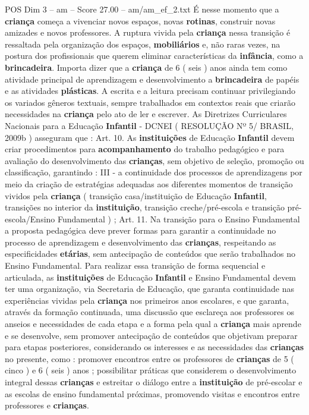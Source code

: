 \begin{textsample}{POS Dim 3 – am – Score 27.00 – am/am\_ef\_2.txt}
É nesse momento que a \textbf{criança} começa a vivenciar novos espaços, novas \textbf{rotinas}, construir novas amizades e novos professores.
A ruptura vivida pela \textbf{criança} nessa transição é ressaltada pela organização dos espaços, \textbf{mobiliários} e, não raras vezes, na postura dos profissionais que querem eliminar características da \textbf{infância}, como a \textbf{brincadeira}.
Importa dizer que a \textbf{criança} de 6 ( seis ) anos ainda tem como atividade principal de aprendizagem e desenvolvimento a \textbf{brincadeira} de papéis e as atividades \textbf{plásticas}.
A escrita e a leitura precisam continuar privilegiando os variados gêneros textuais, sempre trabalhados em contextos reais que criarão necessidades na \textbf{criança} pelo ato de ler e escrever.
As Diretrizes Curriculares Nacionais para a Educação \textbf{Infantil} - DCNEI ( RESOLUÇÃO Nº 5/ BRASIL, 2009b ) asseguram que : Art. 10.
As \textbf{instituições} de Educação \textbf{Infantil} devem criar procedimentos para \textbf{acompanhamento} do trabalho pedagógico e para avaliação do desenvolvimento das \textbf{crianças}, sem objetivo de seleção, promoção ou classificação, garantindo : III - a continuidade dos processos de aprendizagens por meio da criação de estratégias adequadas aos diferentes momentos de transição vividos pela \textbf{criança} ( transição casa/instituição de Educação \textbf{Infantil}, transições no interior da \textbf{instituição}, transição creche/pré-escola e transição pré-escola/Ensino Fundamental ) ; Art. 11.
Na transição para o Ensino Fundamental a proposta pedagógica deve prever formas para garantir a continuidade no processo de aprendizagem e desenvolvimento das \textbf{crianças}, respeitando as especificidades \textbf{etárias}, sem antecipação de conteúdos que serão trabalhados no Ensino Fundamental.
Para realizar essa transição de forma sequencial e articulada, as \textbf{instituições} de Educação \textbf{Infantil} e Ensino Fundamental devem ter uma organização, via Secretaria de Educação, que garanta continuidade nas experiências vividas pela \textbf{criança} nos primeiros anos escolares, e que garanta, através da formação continuada, uma discussão que esclareça aos professores os anseios e necessidades de cada etapa e a forma pela qual a \textbf{criança} mais aprende e se desenvolve, sem promover antecipação de conteúdos que objetivam preparar para etapas posteriores, considerando os interesses e as necessidades das \textbf{crianças} no presente, como : promover encontros entre os professores de \textbf{crianças} de 5 ( cinco ) e 6 ( seis ) anos ; possibilitar práticas que considerem o desenvolvimento integral dessas \textbf{crianças} e estreitar o diálogo entre a \textbf{instituição} de pré-escolar e as escolas de ensino fundamental próximas, promovendo visitas e encontros entre professores e \textbf{crianças}.

\end{textsample}
